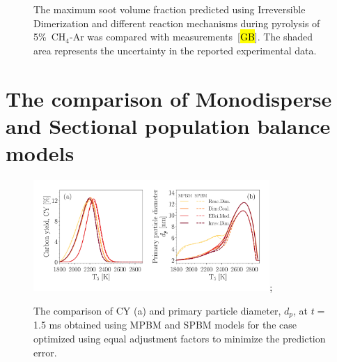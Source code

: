 \begin{figure}[H]
	\centering
	\caption{The maximum soot volume fraction predicted using Irreversible Dimerization and different reaction mechanisms during pyrolysis of 5\%~$\mathrm{CH_4}$-Ar was compared with measurements~[\hl{GB}]. The shaded area represents the uncertainty in the reported experimental data.}
	\label{fig:max_sootfv_chem} 
\end{figure}

\section{The comparison of Monodisperse and Sectional population balance models}

\begin{figure}[H]
	\centering
	\includegraphics[width=0.8\textwidth]{Figures/Results/Shocktube/Agafonov2016_cpr/carbon_yield_d_p_pdynamics.pdf};
	\caption{The comparison of CY (a) and primary particle diameter, $d_p$, at $t=$1.5 ms obtained using MPBM and SPBM models for the case optimized using equal adjustment factors to minimize the prediction error.}
	\label{fig:shockagof_yield_dp_cpr_pdynamics} 
\end{figure}


